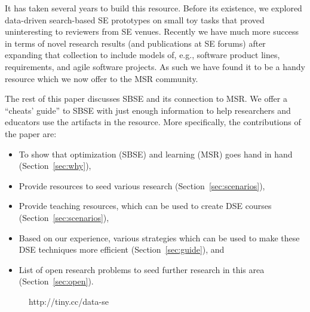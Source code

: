 \documentclass[sigconf]{acmart}
\begin{document}
It has taken several years to build this resource. Before its
existence, we explored data-driven search-based SE
prototypes on small toy tasks that proved uninteresting to reviewers from SE venues. 
Recently we have much more success in terms of novel
research results
(and publications at SE forums) after 
expanding that collection
to include models
of, e.g., software product lines, requirements, and
agile software projects. 
As such we have found it to be a handy resource
which we now offer to the MSR community.

The rest of this paper discusses SBSE and its connection to MSR. 
We offer a ``cheats' guide'' to SBSE with just enough information to help researchers and educators use the artifacts in the resource. More specifically, the contributions of the paper are:
\begin{itemize}[leftmargin=*]
    \item To show that optimization (SBSE) and learning (MSR) goes hand in hand (Section~\ref{sec:why}),
    \item Provide resources to seed various research (Section~\ref{sec:scenarios}),
    \item Provide teaching resources, which can be used to create DSE courses (Section~\ref{sec:scenarios}),
    \item Based on our experience, various strategies which can be used to make these DSE techniques more efficient (Section~\ref{sec:guide}), and
    \item List of open research problems to seed further research in this area (Section~\ref{sec:open}). 
\end{itemize}


\begin{figure}[t]
 \setlength{\fboxsep}{0.5pt}
 
\caption{http://tiny.cc/data-se}\label{fig:one}
\end{figure}
\end{document}
